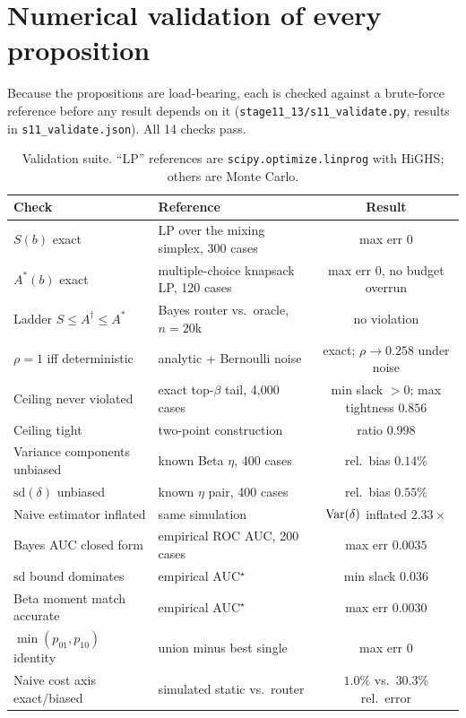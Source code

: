 \section{Numerical validation of every proposition}\label{app:validate}

Because the propositions are load-bearing, each is checked against a
brute-force reference before any result depends on it
(\texttt{stage11\_13/s11\_validate.py}, results in
\texttt{s11\_validate.json}). All 14 checks pass.

\begin{table}[h]\centering\small
\caption{Validation suite. ``LP'' references are \texttt{scipy.optimize.linprog}
with HiGHS; others are Monte Carlo.}
\begin{tabular}{llc}
\toprule
Check & Reference & Result \\
\midrule
$S(b)$ exact & LP over the mixing simplex, 300 cases & max err $0$ \\
$A^*(b)$ exact & multiple-choice knapsack LP, 120 cases & max err $0$, no budget overrun \\
Ladder $S\le A^\dagger\le A^*$ & Bayes router vs.\ oracle, $n{=}20$k & no violation \\
$\rho=1$ iff deterministic & analytic + Bernoulli noise & exact; $\rho\to0.258$ under noise \\
Ceiling never violated & exact top-$\beta$ tail, 4{,}000 cases & min slack $>0$; max tightness $0.856$ \\
Ceiling tight & two-point construction & ratio $0.998$ \\
Variance components unbiased & known Beta $\eta$, 400 cases & rel.\ bias $0.14\%$ \\
$\mathrm{sd}(\delta)$ unbiased & known $\eta$ pair, 400 cases & rel.\ bias $0.55\%$ \\
Naive estimator inflated & same simulation & $\mathrm{Var}(\delta)$ inflated $2.33\times$ \\
Bayes AUC closed form & empirical ROC AUC, 200 cases & max err $0.0035$ \\
$\mathrm{sd}$ bound dominates & empirical AUC$^\star$ & min slack $0.036$ \\
Beta moment match accurate & empirical AUC$^\star$ & max err $0.0030$ \\
$\min(p_{01},p_{10})$ identity & union minus best single & max err $0$ \\
Naive cost axis exact/biased & simulated static vs.\ router & $1.0\%$ vs.\ $30.3\%$ rel.\ error \\
\bottomrule
\end{tabular}
\end{table}

